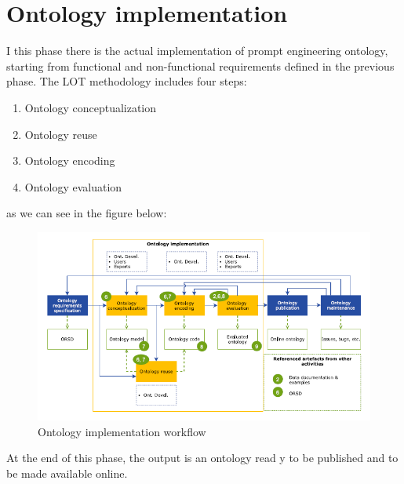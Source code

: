 \section{Ontology implementation}
I this phase there is the actual implementation of prompt engineering ontology, starting from functional and non-functional requirements defined in the previous phase. The LOT methodology includes four steps: 
\begin{enumerate}
    \item Ontology conceptualization

    \item Ontology reuse

    \item Ontology encoding

    \item Ontology evaluation
\end{enumerate}
as we can see in the figure below:
\begin{figure}[H]
    \centering
    \includegraphics[width=0.9\linewidth]{Figures/fig_14.png}
    \caption{Ontology implementation workflow}
    \label{fig:enter-label}
\end{figure}
At the end of this phase, the output is an ontology read y to be published and to be made available online.

